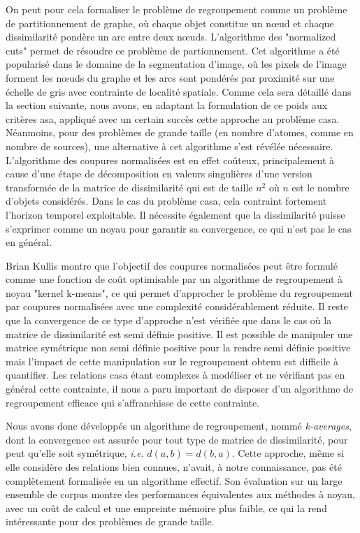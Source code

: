 On peut pour cela formaliser le problème de regroupement comme un problème de partitionnement de graphe, où chaque objet constitue un n\oe{}ud et chaque dissimilarité pondère un arc entre deux n\oe{}uds. L'algorithme des "normalized cuts" permet de résoudre ce problème de partionnement. Cet algorithme a été popularisé dans le domaine de la segmentation d'image\cite{shi2000normalized}, où les pixels de l'image forment les n\oe{}uds du graphe et les arcs sont pondérés par proximité sur une échelle de gris avec contrainte de localité spatiale. Comme cela sera détaillé dans la section suivante, nous avons, en adaptant la formulation de ce poids aux critères asa, appliqué avec un certain succès cette approche au problème casa. Néanmoins, pour des problèmes de grande taille (en nombre d'atomes, comme en nombre de sources), une alternative à cet algorithme s'est révélée nécessaire. L'algorithme des coupures normalisées est en effet coûteux, principalement à cause d'une étape de décomposition en valeurs singulières d'une version transformée de la matrice de dissimilarité qui est de taille $n^2$ où $n$ est le nombre d'objets considérés. Dans le cas du problème casa, cela contraint fortement l'horizon temporel exploitable. Il nécessite également que la dissimilarité puisse s'exprimer comme un noyau pour garantir sa convergence, ce qui n'est pas le cas en général.

Brian Kullis montre que l'objectif des coupures normalisées peut être formulé comme une fonction de coût optimisable par un algorithme de regroupement à noyau "kernel k-means", ce qui permet d'approcher le problème du regroupement par coupures normalisées avec une complexité considérablement réduite. Il reste que la convergence de ce type d'approche n'est vérifiée que dans le cas où la matrice de dissimilarité est semi définie positive. Il est possible de manipuler une matrice symétrique non semi définie positive pour la rendre semi définie positive\cite{optimal2003} mais l'impact de cette manipulation sur le regroupement obtenu est difficile à quantifier. Les relations casa étant complexes à modéliser et ne vérifiant pas en général cette contrainte, il nous a paru important de disposer d'un algorithme de regroupement efficace qui s'affranchisse de cette contrainte.

Nous avons donc développés un algorithme de regroupement, nommé \textsl{k-averages}, dont la convergence est assurée pour tout type de matrice de dissimilarité, pour peut qu'elle soit symétrique, \textit{i.e.} $d(a, b) = d(b,a)$. Cette approche, même si elle considère des relations bien connues, n'avait, à notre connaissance, pas été complètement formalisée  en un algorithme effectif. Son évaluation sur un large ensemble de corpus\cite{UCRArchive} montre des performances équivalentes aux méthodes à noyau, avec un coût de calcul et une empreinte mémoire plus faible, ce qui la rend intéressante pour des problèmes de grande taille\cite{rossignol2018efficient}.

